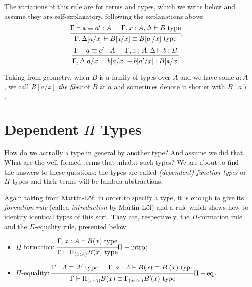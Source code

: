 \begin{enumerate}[(1)]
  The variations of this rule are for terms and types, which we write below
  and assume they are self-explanatory, following the explanations above:
  \[
    \begin{prooftree}
      \hypo{\Gamma \vdash a \equiv a' : A}
      \hypo{\Gamma, x : A, \Delta \vdash B \text{ type}}
      \infer2{\Gamma, \Delta[a/x] \vdash B[a/x] \equiv B[a'/x] \text{ type}}
    \end{prooftree};
  \]
  \[
    \begin{prooftree}
      \hypo{\Gamma \vdash a \equiv a' : A}
      \hypo{\Gamma, x : A, \Delta \vdash b : B}
      \infer2{\Gamma, \Delta[a/x] \vdash b[a/x] \equiv b[a'/x] : B[a/x]}
    \end{prooftree}.
  \]
\end{enumerate}

Taking from geometry, when $ B $ is a family of types over $ A $ and we
have some $ a : A $, we call $ B[a/x] $ \emph{the fiber} of $ B $ at
$ a $ and sometimes denote it shorter with $ B(a) $.

\section{Dependent $ \Pi $ Types}

How do we actually  a type in general by another type?
And assume we did that. What are the well-formed terms that inhabit
such types? We are about to find the answers to these questions:
the types are called \emph{(dependent) function types} or
$ \Pi $-types and their terms will be lambda abstractions.

Again taking from Martin-L\"{o}f, in order to specify a type, it
is enough to give its \emph{formation rule} (called \emph{introduction}
by Martin-L\"{o}f) and a rule which shows how to identify identical
types of this sort. They are, respectively, the $ \Pi $-formation
rule and the $ \Pi $-equality rule, presented below:
\begin{itemize}
\item $ \Pi $ formation:
  $ \begin{prooftree}
    \hypo{\Gamma, x : A \vdash B(x) \text{ type}}
    \infer1{\Gamma \vdash \Pi_{(x : A)} B(x) \text{ type}}
  \end{prooftree} \Pi-\text{intro}
  $;
\item $ \Pi $-equality:
  $ \begin{prooftree}
    \hypo{\Gamma : A \equiv A' \text{ type}}
    \hypo{\Gamma, x : A \vdash B(x) \equiv B'(x) \text{ type}}
    \infer2{\Gamma \vdash \Pi_{(x : A)} B(x) \equiv %
      \Gamma_{(x : A')} B'(x) \text{ type}}
  \end{prooftree} \Pi-\text{eq}
  $.
\end{itemize}

